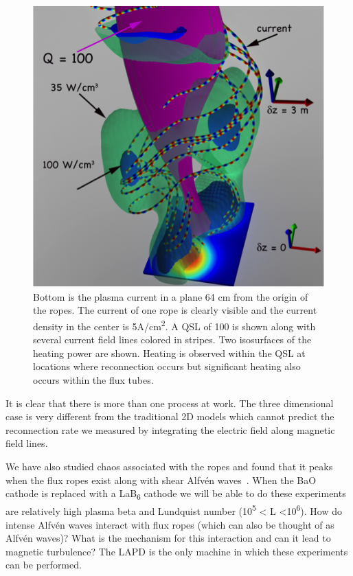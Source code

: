 \documentclass[11pt]{article}
\renewcommand{\cite}{\citep}
\begin{document}
\begin{figure}[!htbp]
\centerline{\includegraphics[width=3.4truein]{ropes2}}
\caption{Bottom is the plasma current in a plane 64 cm from the origin
of the ropes. The current of one rope is clearly visible and the current
density in the center is 5A/cm\textsuperscript{2}. A QSL of 100 is shown
along with several current field lines colored in stripes. Two
isosurfaces of the heating power are shown. Heating is observed within
the QSL at locations where reconnection occurs but significant heating
also occurs within the flux tubes.}\label{ropes2}
\end{figure}


It is clear that there is more than one process at work. The three
dimensional case is very different from the traditional 2D models which
cannot predict the reconnection rate we measured by integrating the
electric field along magnetic field lines.

We have also studied chaos associated with the ropes and
found that it peaks when the flux ropes exist along with shear Alfvén
waves~\cite{gekelman:2014}. When the BaO cathode is replaced with a LaB\textsubscript{6}
cathode we will be able to do these experiments are relatively high
plasma beta and Lundquist number
(10\textsuperscript{5} \textless{} L \textless{}10\textsuperscript{6}).
How do intense Alfvén waves interact with flux ropes (which can also be
thought of as Alfvén waves)? What is the mechanism for this interaction
and can it lead to magnetic turbulence? The LAPD is the only machine in
which these experiments can be performed.
\end{document}
